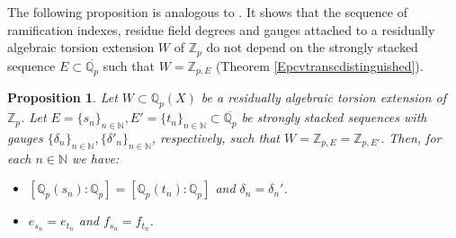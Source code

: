 \documentclass[10pt]{article}
\numberwithin{equation}{section}
\newtheorem{Prop}[equation]{Proposition}
\theoremstyle{definition}\newtheorem{Def}[equation]{Definition}
\theoremstyle{definition}\newtheorem{Ques}[equation]{Question}
\newcommand{\Q}{\mathbb{Q}}
\newcommand{\N}{\mathbb{N}}
\newcommand{\Z}{\mathbb{Z}}
\newcommand{\oQp}{\overline{\Q_p}}
\begin{document}
The following proposition is analogous to \cite[Proposition 2.3]{APZclosed}. It shows that the sequence of ramification indexes,   residue field degrees and gauges attached to a residually algebraic torsion extension $W$ of $\Z_p$ do not depend on the strongly stacked  sequence $E\subset \oQp$ such that $W=\Z_{p,E}$ (Theorem \ref{Epcvtranscdistinguished}).

\begin{Prop}
Let $W\subset\Q_p(X)$ be a residually algebraic torsion extension of $\Z_p$. Let $E=\{s_n\}_{n\in\N},E'=\{t_n\}_{n\in\N}\subset\oQp$ be strongly  stacked sequences with gauges $\{\delta_n\}_{n\in\N},\{\delta'_n\}_{n\in\N}$, respectively, such that $W=\Z_{p,E}=\Z_{p,E'}$. Then, for each $n\in\N$ we have:
\begin{itemize}
\item[i)] $[\Q_p(s_n):\Q_p]=[\Q_p(t_n):\Q_p]$ and $\delta_n=\delta_n'$.
\item[ii)] $e_{s_n}=e_{t_n}$ and $f_{s_n}=f_{t_n}$.
\end{itemize}
\end{Prop}
\end{document}

